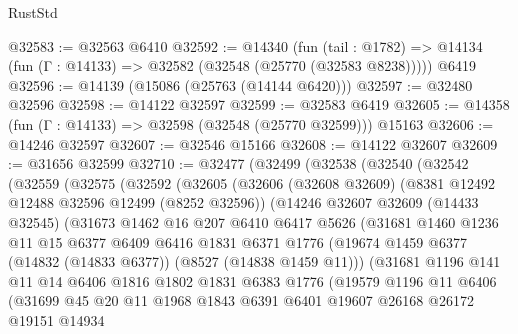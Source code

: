 \begin{lexlean}{RustStd}
\begin{coremodule}
@32583 := @32563 @6410
@32592 := @14340
    (fun (tail : @1782) => @14134 (fun (Γ : @14133) => @32582 (@32548 (@25770 (@32583 @8238)))))
    @6419
@32596 := @14139 (@15086 (@25763 (@14144 @6420)))
@32597 := @32480 @32596
@32598 := @14122 @32597
@32599 := @32583 @6419
@32605 := @14358 (fun (Γ : @14133) => @32598 (@32548 (@25770 @32599))) @15163
@32606 := @14246 @32597
@32607 := @32546 @15166
@32608 := @14122 @32607
@32609 := @31656 @32599
@32710 := @32477
    (@32499
      (@32538
        (@32540
          (@32542
            (@32559
              (@32575
                (@32592
                  (@32605
                    (@32606
                      (@32608 @32609)
                      (@8381 @12492 @12488 @32596 @12499 (@8252 @32596))
                      (@14246
                        @32607
                        @32609
                        (@14433 @32545)
                        (@31673
                          @1462
                          @16
                          @207
                          @6410
                          @6417
                          @5626
                          (@31681
                            @1460
                            @1236
                            @11
                            @15
                            @6377
                            @6409
                            @6416
                            @1831
                            @6371
                            @1776
                            (@19674 @1459 @6377 (@14832 (@14833 @6377)) (@8527 (@14838 @1459 @11)))
                            (@31681
                              @1196
                              @141
                              @11
                              @14
                              @6406
                              @1816
                              @1802
                              @1831
                              @6383
                              @1776
                              (@19579
                                @1196
                                @11
                                @6406
                                (@31699
                                  @45
                                  @20
                                  @11
                                  @1968
                                  @1843
                                  @6391
                                  @6401
                                  @19607
                                  @26168
                                  @26172
                                  @19151
                                  @14934

\end{coremodule}
\end{lexlean}
